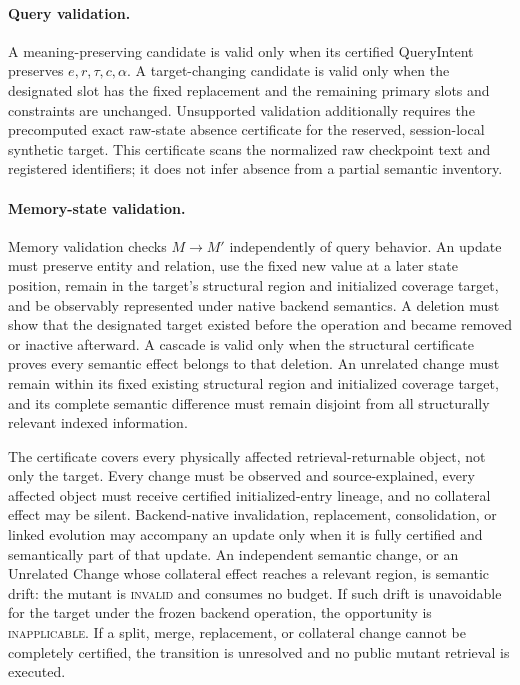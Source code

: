 \paragraph{Query validation.}
A meaning-preserving candidate is valid only when its certified QueryIntent
preserves \(e,r,\tau,c,\alpha\). A target-changing candidate is valid only
when the designated slot has the fixed replacement and the remaining primary
slots and constraints are unchanged. Unsupported validation additionally
requires the precomputed exact raw-state absence certificate for the reserved,
session-local synthetic target. This certificate scans the normalized raw
checkpoint text and registered identifiers; it does not infer absence from a
partial semantic inventory.

\paragraph{Memory-state validation.}
Memory validation checks \(M\rightarrow M'\) independently of query behavior.
An update must preserve entity and relation, use the fixed new value at a later
state position, remain in the target's structural region and initialized
coverage target, and be observably represented under native backend semantics.
A deletion must show that the designated target existed before the operation
and became removed or inactive afterward. A cascade is valid only when the
structural certificate proves every semantic effect belongs to that deletion.
An unrelated change must remain within its fixed existing structural region
and initialized coverage target, and its complete semantic difference must
remain disjoint from all structurally relevant indexed information.

The certificate covers every physically affected retrieval-returnable object,
not only the target. Every change must be observed and source-explained, every
affected object must receive certified initialized-entry lineage, and no
collateral effect may be silent. Backend-native invalidation, replacement,
consolidation, or linked evolution may accompany an update only when it is
fully certified and semantically part of that update. An independent semantic
change, or an Unrelated Change whose collateral effect reaches a relevant
region, is semantic drift: the mutant is \textsc{invalid} and consumes no
budget. If such drift is unavoidable for the target under the frozen backend
operation, the opportunity is \textsc{inapplicable}. If a split, merge,
replacement, or collateral change cannot be completely certified, the
transition is unresolved and no public mutant retrieval is executed.

